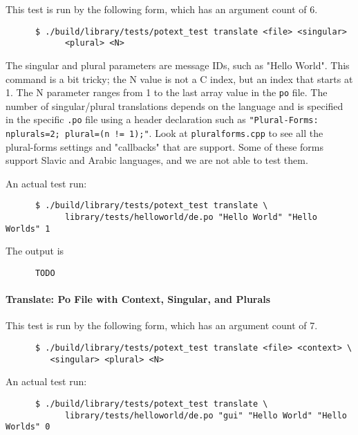    This test is run by the following form, which has an argument count
   of 6.

   \begin{verbatim}
      $ ./build/library/tests/potext_test translate <file> <singular>
            <plural> <N>
   \end{verbatim}

   The singular and plural parameters are message IDs, such as "Hello World".
   This command is a bit tricky; the N value is not a C index, but an
   index that starts at 1.
   The N parameter ranges from 1 to the last array value in
   the \texttt{po} file.
   The number of singular/plural translations depends on the language and
   is specified in the specific \texttt{.po} file using
   a header declaration such as
   \texttt{"Plural-Forms: nplurals=2; plural=(n != 1);"}.
   Look at \texttt{pluralforms.cpp} to see all the plural-forms settings and
   "callbacks" that are support.
   Some of these forms support Slavic and Arabic languages, and we are not able
   to test them.

   An actual test run:

   \begin{verbatim}
      $ ./build/library/tests/potext_test translate \
            library/tests/helloworld/de.po "Hello World" "Hello Worlds" 1
   \end{verbatim}

   The output is

   \begin{verbatim}
      TODO
   \end{verbatim}

\paragraph{Translate: Po File with Context, Singular, and Plurals}
\label{paragraph:potext_test_translate_po_context_singular_plural}

   This test is run by the following form, which has an argument count
   of 7.

   \begin{verbatim}
      $ ./build/library/tests/potext_test translate <file> <context> \
         <singular> <plural> <N>
   \end{verbatim}

   An actual test run:

   \begin{verbatim}
      $ ./build/library/tests/potext_test translate \
            library/tests/helloworld/de.po "gui" "Hello World" "Hello Worlds" 0
   \end{verbatim}

